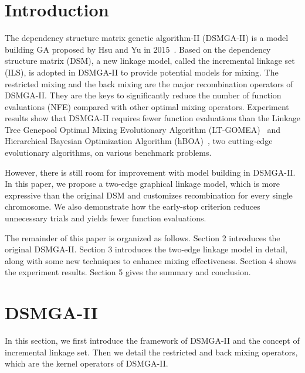 \section{Introduction}

The dependency structure matrix genetic algorithm-II (DSMGA-II) is a model building GA proposed by Hsu and Yu in 2015~\cite{hsu:DSMGA2}.
Based on the dependency structure matrix (DSM), a new linkage model, called the incremental linkage set (ILS), is adopted in DSMGA-II to provide potential models for mixing. 
The restricted mixing and the back mixing are the major recombination operators of DSMGA-II. 
They are the keys to significantly reduce the number of function evaluations (NFE) compared with other optimal mixing operators. 
Experiment results show that DSMGA-II requires fewer function evaluations than the Linkage Tree Genepool Optimal Mixing Evolutionary Algorithm (LT-GOMEA)~\cite{bosman:LT-GOMEA} and Hierarchical Bayesian Optimization Algorithm (hBOA)~\cite{pelikan:hBOA}, two cutting-edge evolutionary algorithms, on various benchmark problems. 

However, there is still room for improvement with model building in DSMGA-II. 
In this paper, we propose a two-edge graphical linkage model, which is more expressive than the original DSM and customizes recombination for every single chromosome. 
We also demonstrate how the early-stop criterion reduces unnecessary trials and yields fewer function evaluations.

The remainder of this paper is organized as follows. 
Section 2 introduces the original DSMGA-II. 
Section 3 introduces the two-edge linkage model in detail, along with some new techniques to enhance mixing effectiveness. 
Section 4 shows the experiment results. 
Section 5 gives the summary and conclusion.



\section{DSMGA-II}
In this section, we first introduce the framework of DSMGA-II and the concept of incremental linkage set. 
Then we detail the restricted and back mixing operators, which are the kernel operators of DSMGA-II.

